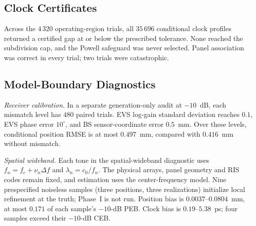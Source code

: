 \documentclass[journal,letterpaper]{IEEEtran}
\begin{document}
\subsection{Clock Certificates}

Across the $4\,320$ operating-region trials, all $35\,696$ conditional clock
profiles returned a certified gap at or below the prescribed tolerance.
None reached the subdivision cap, and the Powell safeguard was never
selected.  Panel association was correct in every trial; two trials were
catastrophic.

\subsection{Model-Boundary Diagnostics}

\emph{Receiver calibration.}
In a separate generation-only audit at $-10$~dB, each mismatch level has
$480$ paired trials.  EVS log-gain standard deviation reaches $0.1$, EVS
phase error $10^\circ$, and BS sensor-coordinate error $0.5$~mm.  Over these
levels, conditional position RMSE is at most $0.497$~mm, compared with
$0.416$~mm without mismatch.

\emph{Spatial wideband.}
Each tone in the spatial-wideband diagnostic uses
$f_n=f_c+\nu_n\Delta f$ and $\lambda_n=c_0/f_n$. The physical arrays,
panel geometry and RIS codes remain fixed, and estimation uses the
center-frequency model. Nine prespecified noiseless samples (three
positions, three realizations) initialize local refinement at the truth;
Phase~I is not run. Position bias is $0.0037$--$0.0804$~mm, at most
$0.171$ of each sample's $-10$-dB PEB. Clock bias is
$0.19$--$5.38$~ps; four samples exceed their $-10$-dB CEB.

\balance


\end{document}
